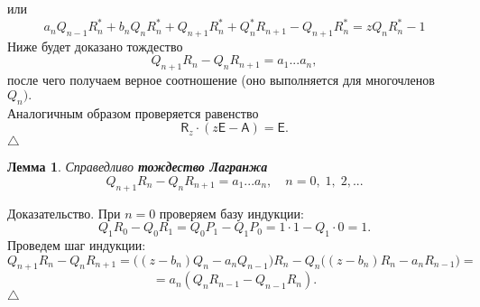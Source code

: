 \documentclass[12pt,a4paper]{article}
\theoremstyle{plain}   \newtheorem{Pro}{Задача}
\newtheorem{Lem}{Лемма}
\begin{document}
или
$$
  a_n Q_{n-1} R_n ^{\ast} +
  b_n Q_n R_n ^{\ast} +
  Q_{n+1} R_n ^{\ast} +
  Q_n ^{\ast} R_{n+1} -
  Q_{n+1} R_n ^{\ast} =
  z Q_n R_n ^{\ast} -1
$$
Ниже будет доказано тождество
$$
  Q_{n+1} R_n - Q_n R_{n+1} =a_1 ...a_n ,
$$
после чего получаем верное соотношение (оно выполняется для
многочленов
$ Q_n ). $
\\
Аналогичным образом проверяется равенство
$$
  \mathsf{R}_z \cdot
  (z \mathsf{E} - \mathsf{A} )= \mathsf{E} .
$$
$ \triangle $
\begin{Lem}
Справедливо
{\bfseries тождество Лагранжа}
$$
  Q_{n+1} R_n -Q_n R_{n+1} =
  a_1 ...a_n , \quad n=0, \; 1, \; 2,...
$$
\end{Lem}
{\Large Доказательство.}
При
$ n=0 $
проверяем базу индукции:
$$
  Q_1 R_0 -Q_0 R_1 = Q_0 P_1 -Q_1 P_0 =1 \cdot 1 -
  Q_1 \cdot 0 =1.
$$
Проведем шаг индукции:
$$
  Q_{n+1} R_n -Q_n R_{n+1} =
  \bigl ( (z-b_n )Q_n -a_n Q_{n-1} \bigr ) R_n -
  Q_n \bigl ( (z-b_n )R_n -a_n R_{n-1} \bigr ) =
$$
$$
  =a_n ( Q_n R_{n-1} - Q_{n-1} R_n ) .
$$
$ \triangle $
\newpage
\end{document}
